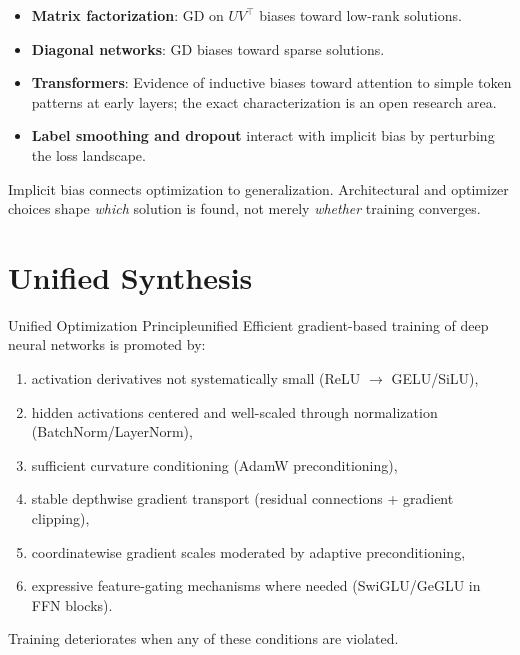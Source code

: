 \documentclass[12pt,a4paper]{article}
\theoremstyle{definition}
\theoremstyle{remark}
\begin{document}
\begin{practbox}
\begin{itemize}
    \item \textbf{Matrix factorization}: GD on $UV^\top$ biases toward low-rank solutions.
    \item \textbf{Diagonal networks}: GD biases toward sparse solutions.
    \item \textbf{Transformers}: Evidence of inductive biases toward attention to simple token patterns at early layers; the exact characterization is an open research area.
    \item \textbf{Label smoothing and dropout} interact with implicit bias by perturbing the loss landscape.
\end{itemize}
\end{practbox}

\begin{keybox}
Implicit bias connects optimization to generalization. Architectural and optimizer choices shape \emph{which} solution is found, not merely \emph{whether} training converges.
\end{keybox}

\section{Unified Synthesis}

\begin{mytheorem}{Unified Optimization Principle}{unified}
Efficient gradient-based training of deep neural networks is promoted by:
\begin{enumerate}
    \item activation derivatives not systematically small (ReLU $\to$ GELU/SiLU),
    \item hidden activations centered and well-scaled through normalization (BatchNorm/LayerNorm),
    \item sufficient curvature conditioning (AdamW preconditioning),
    \item stable depthwise gradient transport (residual connections + gradient clipping),
    \item coordinatewise gradient scales moderated by adaptive preconditioning,
    \item expressive feature-gating mechanisms where needed (SwiGLU/GeGLU in FFN blocks).
\end{enumerate}
Training deteriorates when any of these conditions are violated.
\end{mytheorem}
\end{document}
